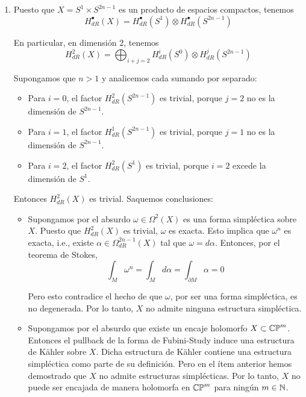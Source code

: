 \begin{solution}
\begin{enumerate}[label=\alph*)]
    \item Puesto que $X = S^1 \times S^{2n-1}$ es un producto de espacios compactos, tenemos
    $$H_{dR}^\bullet(X) = H_{dR}^\bullet(S^1) \otimes H_{dR}^\bullet(S^{2n-1})$$
    
    En particular, en dimensión $2$, tenemos
    $$H_{dR}^2(X) = \bigoplus_{i+j=2} H_{dR}^i(S^0) \otimes H_{dR}^j(S^{2n-1})$$
    
    Supongamos que $n > 1$ y analicemos cada sumando por separado:
    \begin{itemize}
        \item Para $i = 0$, el factor $H_{dR}^2(S^{2n-1})$ es trivial, porque $j = 2$ no es la dimensión de $S^{2n-1}$.
        
        \item Para $i = 1$, el factor $H_{dR}^1(S^{2n-1})$ es trivial, porque $j = 1$ no es la dimensión de $S^{2n-1}$.
        
        \item Para $i = 2$, el factor $H_{dR}^2(S^1)$ es trivial, porque $i = 2$ excede la dimensión de $S^1$.
    \end{itemize}
    
    Entonces $H_{dR}^2(X)$ es trivial. Saquemos conclusiones:
    \begin{itemize}
        \item Supongamos por el absurdo $\omega \in \Omega^2(X)$ es una forma simpléctica sobre $X$. Puesto que $H_{dR}^2(X)$ es trivial, $\omega$ es exacta. Esto implica que $\omega^n$ es exacta, i.e., existe $\alpha \in \Omega_{dR}^{2n-1}(X)$ tal que $\omega = d\alpha$. Entonces, por el teorema de Stokes,
        $$\int_M \omega^n = \int_M d\alpha = \int_{\partial M} \alpha = 0$$
        
        Pero esto contradice el hecho de que $\omega$, por ser una forma simpléctica, es no degenerada. Por lo tanto, $X$ no admite ninguna estructura simpléctica.
        
        \item Supongamos por el absurdo que existe un encaje holomorfo $X \subset \mathbb {CP}^m$. Entonces el pullback de la forma de Fubini-Study induce una estructura de Kähler sobre $X$. Dicha estructura de Kähler contiene una estructura simpléctica como parte de su definición. Pero en el ítem anterior hemos demostrado que $X$ no admite estructuras simplécticas. Por lo tanto, $X$ no puede ser encajada de manera holomorfa en $\mathbb {CP}^m$ para ningún $m \in \mathbb N$.
    \end{itemize}
    

\end{enumerate}
\end{solution}
